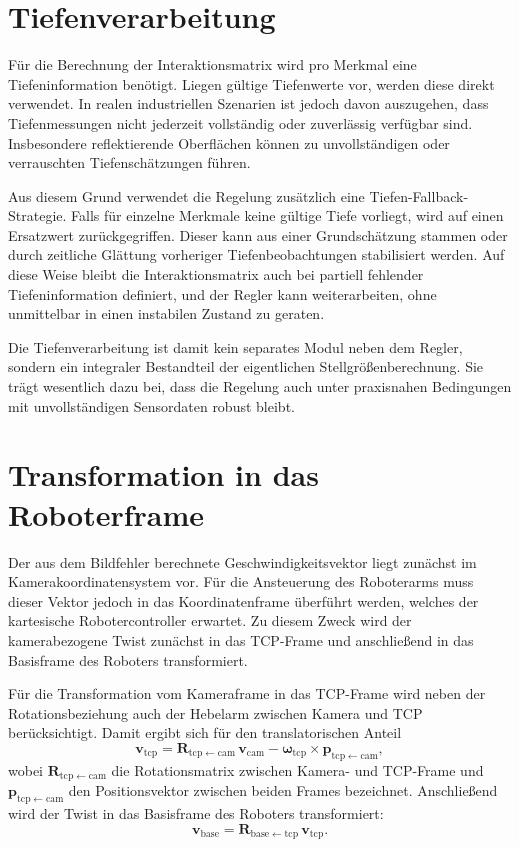 \section{Tiefenverarbeitung}
\label{sec:tiefenverarbeitung_regler}

Für die Berechnung der Interaktionsmatrix wird pro Merkmal eine Tiefeninformation benötigt. Liegen gültige Tiefenwerte vor, werden diese direkt verwendet. In realen industriellen Szenarien ist jedoch davon auszugehen, dass Tiefenmessungen nicht jederzeit vollständig oder zuverlässig verfügbar sind. Insbesondere reflektierende Oberflächen können zu unvollständigen oder verrauschten Tiefenschätzungen führen.

Aus diesem Grund verwendet die Regelung zusätzlich eine Tiefen-Fallback-Strategie. Falls für einzelne Merkmale keine gültige Tiefe vorliegt, wird auf einen Ersatzwert zurückgegriffen. Dieser kann aus einer Grundschätzung stammen oder durch zeitliche Glättung vorheriger Tiefenbeobachtungen stabilisiert werden. Auf diese Weise bleibt die Interaktionsmatrix auch bei partiell fehlender Tiefeninformation definiert, und der Regler kann weiterarbeiten, ohne unmittelbar in einen instabilen Zustand zu geraten.

Die Tiefenverarbeitung ist damit kein separates Modul neben dem Regler, sondern ein integraler Bestandteil der eigentlichen Stellgrößenberechnung. Sie trägt wesentlich dazu bei, dass die Regelung auch unter praxisnahen Bedingungen mit unvollständigen Sensordaten robust bleibt.

\section{Transformation in das Roboterframe}
\label{sec:transformation_roboterrahmen}

Der aus dem Bildfehler berechnete Geschwindigkeitsvektor liegt zunächst im Kamerakoordinatensystem vor. Für die Ansteuerung des Roboterarms muss dieser Vektor jedoch in das Koordinatenframe überführt werden, welches der kartesische Robotercontroller erwartet. Zu diesem Zweck wird der kamerabezogene Twist zunächst in das \ac{TCP}-Frame und anschließend in das Basisframe des Roboters transformiert.

Für die Transformation vom Kameraframe in das \ac{TCP}-Frame wird neben der Rotationsbeziehung auch der Hebelarm zwischen Kamera und \ac{TCP} berücksichtigt. Damit ergibt sich für den translatorischen Anteil
\begin{equation}
\mathbf{v}_{\mathrm{tcp}} =
\mathbf{R}_{\mathrm{tcp}\leftarrow\mathrm{cam}}\,\mathbf{v}_{\mathrm{cam}}
-
\boldsymbol{\omega}_{\mathrm{tcp}} \times \mathbf{p}_{\mathrm{tcp}\leftarrow\mathrm{cam}},
\end{equation}
wobei \(\mathbf{R}_{\mathrm{tcp}\leftarrow\mathrm{cam}}\) die Rotationsmatrix zwischen Kamera- und \ac{TCP}-Frame und \(\mathbf{p}_{\mathrm{tcp}\leftarrow\mathrm{cam}}\) den Positionsvektor zwischen beiden Frames bezeichnet. Anschließend wird der Twist in das Basisframe des Roboters transformiert:
\begin{equation}
\mathbf{v}_{\mathrm{base}} =
\mathbf{R}_{\mathrm{base}\leftarrow\mathrm{tcp}}\,\mathbf{v}_{\mathrm{tcp}}.
\end{equation}

